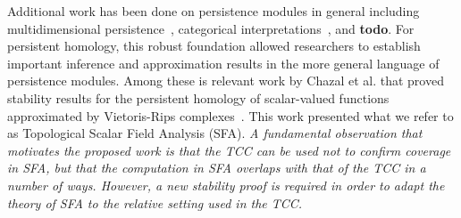 Additional work has been done on persistence modules in general including multidimensional persistence~\cite{carlsson2009theory,carlsson2009computing,lesnick2015theory}, categorical interpretations~\cite{todo}, and \textbf{todo}.
For persistent homology, this robust foundation allowed researchers to establish important inference and approximation results in the more general language of persistence modules.
Among these is relevant work by Chazal et al. that proved stability results for the persistent homology of scalar-valued functions approximated by Vietoris-Rips complexes~\cite{chazal09analysis}.
This work presented what we refer to as Topological Scalar Field Analysis (SFA).
\emph{A fundamental observation that motivates the proposed work is that the TCC can be used not to confirm coverage in SFA, but that the computation in SFA overlaps with that of the TCC in a number of ways.
However, a new stability proof is required in order to adapt the theory of SFA to the relative setting used in the TCC.}

